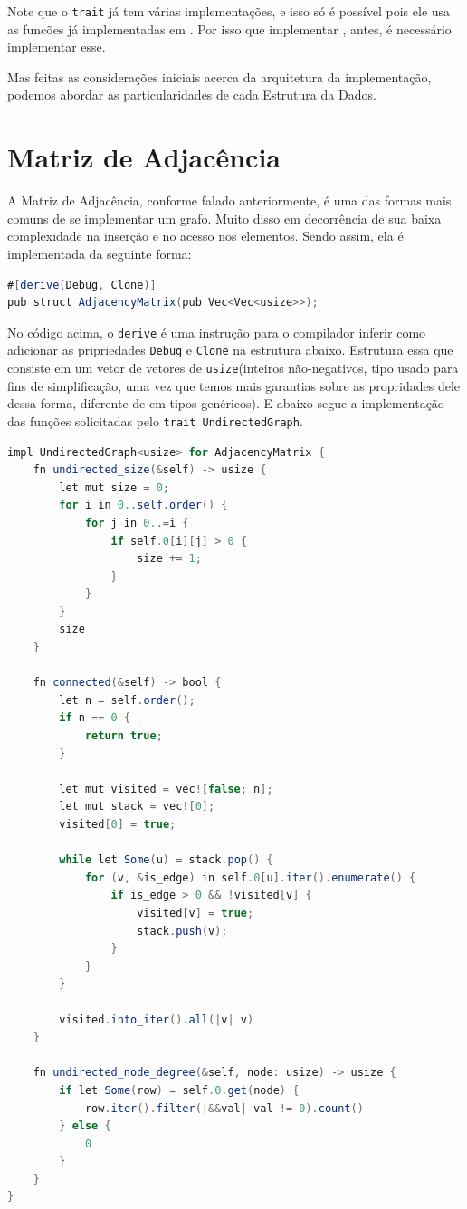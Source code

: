 Note que o \texttt{trait} já tem várias implementações, e isso só é possível pois ele usa as funcões já implementadas em . Por isso que implementar , antes, é necessário implementar esse.

Mas feitas as considerações iniciais acerca da arquitetura da implementação, podemos abordar as particularidades de cada Estrutura da Dados.

\section{Matriz de Adjacência}

A Matriz de Adjacência, conforme falado anteriormente, é uma das formas mais comuns de se implementar um grafo. Muito disso em decorrência de sua baixa complexidade na inserção e no acesso nos elementos. Sendo assim, ela é implementada da seguinte forma:

\begin{lstlisting}[language=Java, caption={Implementação da Estrutura de Dados Matriz de Adjacência}, label=list:struct_adj_mat]
#[derive(Debug, Clone)]
pub struct AdjacencyMatrix(pub Vec<Vec<usize>>);
\end{lstlisting}

No código acima, o \texttt{derive} é uma instrução para o compilador inferir como adicionar as pripriedades \texttt{Debug} e \texttt{Clone} na estrutura abaixo. Estrutura essa que consiste em um vetor de vetores de \texttt{usize}(inteiros não-negativos, tipo usado para fins de simplificação, uma vez que temos mais garantias sobre as propridades dele dessa forma, diferente de em tipos genéricos). E abaixo segue a implementação das funções solicitadas pelo \texttt{trait UndirectedGraph}.

\begin{lstlisting}[language=Java, caption={Implementação de UndirectedGraph na Estrutura de Dados Matriz de Adjacência}, label=list:impl_adj_mat_ug] impl UndirectedGraph<usize> for AdjacencyMatrix {
    fn undirected_size(&self) -> usize {
        let mut size = 0;
        for i in 0..self.order() {
            for j in 0..=i {
                if self.0[i][j] > 0 {
                    size += 1;
                }
            }
        }
        size
    }

    fn connected(&self) -> bool {
        let n = self.order();
        if n == 0 {
            return true;
        }

        let mut visited = vec![false; n];
        let mut stack = vec![0];
        visited[0] = true;

        while let Some(u) = stack.pop() {
            for (v, &is_edge) in self.0[u].iter().enumerate() {
                if is_edge > 0 && !visited[v] {
                    visited[v] = true;
                    stack.push(v);
                }
            }
        }

        visited.into_iter().all(|v| v)
    }

    fn undirected_node_degree(&self, node: usize) -> usize {
        if let Some(row) = self.0.get(node) {
            row.iter().filter(|&&val| val != 0).count()
        } else {
            0
        }
    }
}
\end{lstlisting}

